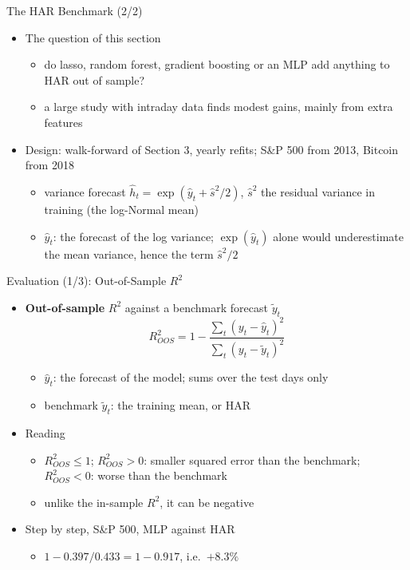 \begin{frame}{The HAR Benchmark (2/2)}
\itemsize{\small}
\begin{itemize}
    \item The question of this section
    \begin{itemize}
        \item do lasso, random forest, gradient boosting or an MLP add anything to HAR out of sample?
        \item a large study with intraday data finds modest gains, mainly from extra features 
    \end{itemize}
    \item Design: walk-forward of Section 3, yearly refits; S\&P 500 from 2013, Bitcoin from 2018
    \begin{itemize}
        \item variance forecast $\hat h_t = \exp(\hat y_t + \hat s^2/2)$, $\hat s^2$ the residual variance in training (the log-Normal mean)
        \item $\hat y_t$: the forecast of the log variance; $\exp(\hat y_t)$ alone would underestimate the mean variance, hence the term $\hat s^2/2$
    \end{itemize}
\end{itemize}
\end{frame}

\begin{frame}{Evaluation (1/3): Out-of-Sample $R^2$}
\itemsize{\small}
\begin{itemize}
    \item \textbf{Out-of-sample} $R^2$ against a benchmark forecast $\tilde y_t$  \[ R^2_{OOS} = 1 - \frac{\sum_t (y_t - \hat y_t)^2}{\sum_t (y_t - \tilde y_t)^2} \]
    \begin{itemize}
        \item $\hat y_t$: the forecast of the model; sums over the test days only
        \item benchmark $\tilde y_t$: the training mean, or HAR
    \end{itemize}
    \item Reading
    \begin{itemize}
        \item $R^2_{OOS} \le 1$; $R^2_{OOS} > 0$: smaller squared error than the benchmark; $R^2_{OOS} < 0$: worse than the benchmark
        \item unlike the in-sample $R^2$, it can be negative
    \end{itemize}
    \item Step by step, S\&P 500, MLP against HAR
    \begin{itemize}
        \item $1 - 0.397/0.433 = 1 - 0.917$, i.e.\ $+8.3\%$
    \end{itemize}
\end{itemize}
\end{frame}

